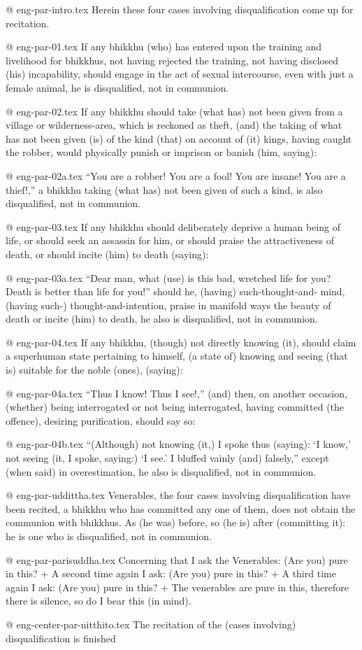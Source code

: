 @ eng-par-intro.tex
Herein these four cases involving disqualification come up for recitation.

@ eng-par-01.tex
If any bhikkhu (who) has entered upon the training and livelihood for bhikkhus, not having rejected the training, not having disclosed (his) incapability, should engage in the act of sexual intercourse, even with just a female animal, he is disqualified, not in communion.

@ eng-par-02.tex
If any bhikkhu should take (what has) not been given from a village or wilderness-area, which is reckoned as theft, (and) the taking of what has not been given (is) of the kind (that) on account of (it) kings, having caught the robber, would physically punish or imprison or banish (him, saying):

@ eng-par-02a.tex
“You are a robber! You are a fool! You are insane! You are a thief!,” a bhikkhu taking (what has) not been given of such a kind, is also disqualified, not in communion.

@ eng-par-03.tex
If any bhikkhu should deliberately deprive a human being of life, or should seek an assassin for him, or should praise the attractiveness of death, or should incite (him) to death (saying):

@ eng-par-03a.tex
“Dear man, what (use) is this bad, wretched life for you? Death is better than life for you!” should he, (having) such-thought-and- mind, (having such-) thought-and-intention, praise in manifold ways the beauty of death or incite (him) to death, he also is disqualified, not in communion.

@ eng-par-04.tex
If any bhikkhu, (though) not directly knowing (it), should claim a superhuman state pertaining to himself, (a state of) knowing and seeing (that is) suitable for the noble (ones), (saying):

@ eng-par-04a.tex
“Thus I know! Thus I see!,” (and) then, on another occasion, (whether) being interrogated or not being interrogated, having committed (the offence), desiring purification, should say so:

@ eng-par-04b.tex
“(Although) not knowing (it,) I spoke thus (saying): `I know,’ not seeing (it, I spoke, saying:) `I see.’ I bluffed vainly (and) falsely,” except (when said) in overestimation, he also is disqualified, not in communion.

@ eng-par-uddittha.tex
Venerables, the four cases involving disqualification have been recited, a bhikkhu who has committed any one of them, does not obtain the communion with bhikkhus. As (he was) before, so (he is) after (committing it): he is one who is disqualified, not in communion.

@ eng-par-parisuddha.tex
Concerning that I ask the Venerables: (Are you) pure in this? +
A second time again I ask: (Are you) pure in this? +
A third time again I ask: (Are you) pure in this? +
The venerables are pure in this, therefore there is silence, so do I bear this (in mind).

@ eng-center-par-nitthito.tex
The recitation of the (cases involving) disqualification is finished
